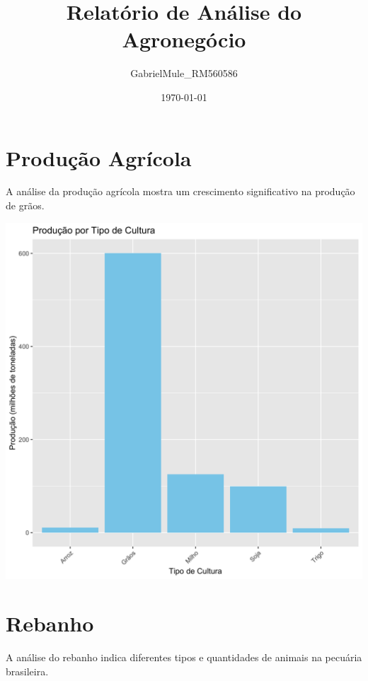 \documentclass{article}
\title{Relatório de Análise do Agronegócio}
\author{GabrielMule\_RM560586}
\date{\today}
\begin{document}
\maketitle

\section{Produção Agrícola}
A análise da produção agrícola mostra um crescimento significativo na produção de grãos.

\includegraphics[width=\textwidth]{build/producao_por_cultura.png}

\section{Rebanho}
A análise do rebanho indica diferentes tipos e quantidades de animais na pecuária brasileira.
\end{document}
